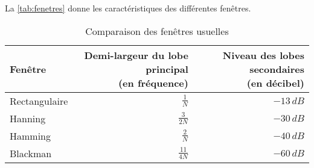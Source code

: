         La \autoref{tab:fenetres} donne les caractéristiques des différentes fenêtres.

        \begin{table}
            \centering
            \begin{tabular}{lrr}
                \toprule
                Fenêtre & \makecell{Demi-largeur du lobe principal\\(en fréquence)} & \makecell{Niveau des lobes secondaires\\(en décibel)}\\
                \midrule
                Rectangulaire & $\frac{1}{N}$ & $-13\,dB$\\
                Hanning & $\frac{3}{2N}$ & $-30\,dB$\\
                Hamming & $\frac{2}{N}$ & $-40\,dB$\\
                Blackman & $\frac{11}{4N}$ & $-60\,dB$\\
                \bottomrule
            \end{tabular}
            \caption{Comparaison des fenêtres usuelles}
            \label{tab:fenetres}
        \end{table}